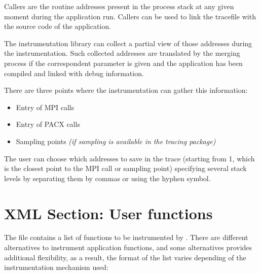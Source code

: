 

Callers are the routine addresses present in the process stack at any given moment during the application run. Callers can be used to link the tracefile with the source code of the application.

The instrumentation library can collect a partial view of those addresses during the instrumentation. Such collected addresses are translated by the merging process if the correspondent parameter is given and the application has been compiled and linked with debug information.

There are three points where the instrumentation can gather this information:

\begin{itemize}
 \item Entry of MPI calls
 \item Entry of PACX calls
 \item Sampling points {\em (if sampling is available in the tracing package)}
\end{itemize}

The user can choose which addresses to save in the trace (starting from 1, which is the closest point to the MPI call or sampling point) specifying several stack levels by separating them by commas or using the hyphen symbol.


\section{XML Section: User functions}\label{sec:XMLSectionUF}



The file contains a list of functions to be instrumented by \TRACE. There are different alternatives to instrument application functions, and some alternatives provides additional flexibility, as a result, the format of the list varies depending of the instrumentation mechanism used:

